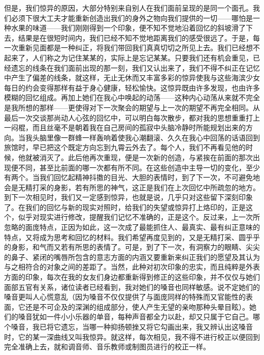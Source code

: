 \par 但是，我们惊异的原因，大部分特别来自别人在我们面前呈现的是同一个面孔。我们必须下很大工夫才能重新创造出我们的身外之物向我们提供的一切——哪怕是一种水果的味道——我们刚刚得到一个印象，便不知不觉地沿着回忆的斜坡滑了下去，结果是在很短时间内，我们已经不知不觉地距离我们的感受很远了。于是，每一次重新见面都是一种纠正，将我们带回我们真真切切之所见上去。我们已经想不起来了，人们称之为记住某某的，实际上是忘记某某。只要我们还有机会重见，已经遗忘的线条在我们面前出现的那一刻，我们又认出来了，我们不得不纠正在记忆中产生了偏差的线条，就这样，无止无休而又丰富多彩的惊异使我与这些海滨少女每日的约会变得那样有益于身心健康，轻松愉快。这惊异既由许多发现，也由许多模糊的回忆组成。再加上她们在我心中唤起的动荡——这种内心动荡从来就不完全是我所想的那样——更使得对下一次聚会的期望与上一次的期望不再完全相同。从最后一次交谈那尚动人心弦的回忆中，可以明白每次散步，都对我的思想重重打上一闷棍，而且丝毫不是朝着我在自己房间的孤寂中头脑冷静时所能规划出来的方向。当我头脑里像一群蜂一样轰响着使我心潮翻滚、久久在我心中回荡的话语回到旅馆时，早已把这个既定方向忘到九霄云外去了。每个人，我们不再看见他的时候，他就被消灭了。此后他再次重现，便是一次新的创造，与紧挨在前面的那次出现便不同，甚至比前面的哪一次都有所不同。在这些创造中主导一切的变化，至少有两个。当我们回忆起精神抖擞的目光、大胆的表情时，到了下一次，不可避免地会是无精打采的身影，若有所思的神气，这正是我们在上次回忆中所疏忽的地方。到下一次相见时，我们又一定感到惊异，也就是说，几乎只对这些留下深刻印象了。在我们的回忆与新的现实对照时，给我们的失望或惊异打上烙印的，正是这个，似乎对现实进行修改，提醒我们记忆不准确的，正是这个。反过来，上一次所忽略的面庞特点，正因为如此，这一次成了最能抓住人、最真实、最有纠正意味的特点，又将成为思考和回忆的材料。我们希望再度见到的，又是无精打采、圆乎乎的身影，和气而又若有所思的表情了。可是，到了下一次，有洞察力的眼睛、尖尖的鼻子、紧闭的嘴唇所包含的意志方面的内涵又要重新来纠正我们的愿望及其认为与之相符合的对象之间的差距了。当然，此种对初次印象的忠实，而且纯粹是外表方面的印象，每次在我的女友们身边都重新得到修正的这些印象，并不仅仅与她们面部五官有关系，诸位读者已经看到，我对她们的嗓音也同样敏感。说不定她们的嗓音更叫人心慌意乱（因为嗓音不仅仅提供了与面庞同样的特殊而又官能性的表面，它还是不可企及的深渊的组成部分，使人产生无望的亲吻那种头晕目眩）。她们的嗓音犹如一件小小乐器的单音，每种声音都全力以赴，却又只属于它自己。哪个嗓音，我已将它遗忘，当哪一种抑扬顿挫又将它勾画出来，我又辨认出这嗓音时，它的某一深曲线又叫我惊异。就这样，每次相见，我不得不进行校正以便回到完全准确上去，就和调音师、音乐教师或制图员进行的校正一样。
